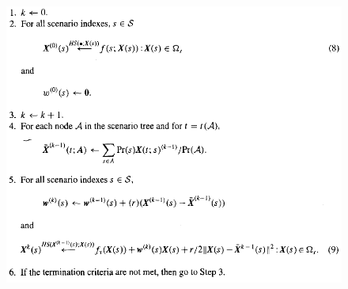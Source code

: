 \documentclass[
]{article}
\begin{document}
\begin{figure}[h!]
    \centering
    \includegraphics[width=1\columnwidth]{Images/ProgressiveHedgingandTabuSearch.png}
    \label{fig:ProgressiveHedgingandTabuSearch}
\end{figure}
\end{document}
